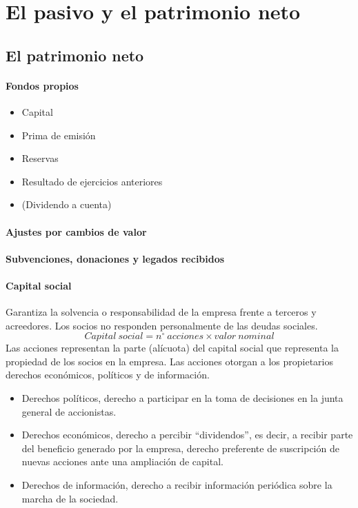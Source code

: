 \section{El pasivo y el patrimonio neto}
\subsection{El patrimonio neto}
\paragraph{Fondos propios}
\begin{itemize}
    \item Capital
    \item Prima de emisión
    \item Reservas
    \item Resultado de ejercicios anteriores
    \item (Dividendo a cuenta)
\end{itemize}
\paragraph{Ajustes por cambios de valor}
\paragraph{Subvenciones, donaciones y legados recibidos}
\paragraph{Capital social}
Garantiza la solvencia o responsabilidad de la empresa frente a terceros y acreedores. Los socios no responden personalmente de las deudas sociales.
\[ Capital\ social = n^\circ\ acciones \times valor\ nominal \]
Las acciones representan la parte (alícuota) del capital social que representa la propiedad de los socios en la empresa. 
Las acciones otorgan a los propietarios derechos económicos, políticos y de información.
\begin{itemize}
    \item Derechos políticos, derecho a participar en la toma de decisiones en la junta general de accionistas.
    \item Derechos económicos, derecho a percibir ``dividendos'', es decir, a recibir parte del beneficio generado por la empresa, derecho preferente de suscripción de nuevas acciones ante una ampliación de capital.
    \item Derechos de información, derecho a recibir información periódica sobre la marcha de la sociedad.
\end{itemize}

